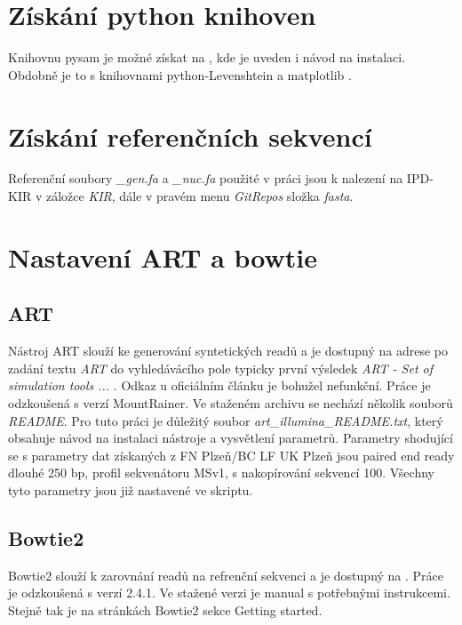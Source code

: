 \documentclass[czech,DP]{thesiskiv}
\numberwithin{equation}{section}
\begin{document}
\section{Získání python knihoven}
Knihovnu pysam je možné získat na \cite{pysam}, kde je uveden i návod na instalaci. Obdobně je to s knihovnami python-Levenshtein \cite{python_leve} a matplotlib \cite{matplotlib}.

\section{Získání referenčních sekvencí}
Referenční soubory \textit{\_gen.fa} a \textit{\_nuc.fa} použité v práci jsou k nalezení na IPD-KIR \cite{imgt_hla_database} v záložce \textit{KIR}, dále v pravém menu \textit{GitRepos} složka \textit{fasta}.


\section{Nastavení ART a bowtie}
\subsection{ART}
Nástroj ART slouží ke generování syntetických readů a je dostupný na adrese \cite{art_download} po zadání textu \textit{ART} do vyhledávácího pole typicky první výsledek \textit{ART - Set of simulation tools ... }. Odkaz u oficiálním článku \cite{art} je bohužel nefunkční. Práce je odzkoušená s verzí MountRainer. Ve staženém archivu se nechází několik souborů \textit{README}. Pro tuto práci je důležitý soubor \textit{art\_illumina\_README.txt}, který obsahuje návod na instalaci nástroje a vysvětlení parametrů. Parametry shodující se s parametry dat získaných z FN Plzeň/BC LF UK Plzeň jsou paired end ready dlouhé 250 bp, profil sekvenátoru MSv1, s nakopírování sekvencí 100. Všechny tyto parametry jsou již nastavené ve skriptu.


\subsection{Bowtie2}
Bowtie2 slouží k zarovnání readů na refrenční sekvenci a je dostupný na \cite{bowtie2_download}. Práce je odzkoušená s verzí 2.4.1. Ve stažené verzi je manual s potřebnými instrukcemi. Stejně tak je na stránkách Bowtie2 sekce Getting started. 
\end{document}
